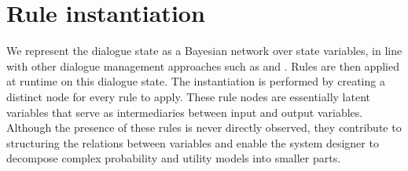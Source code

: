 

\section{Rule instantiation}
\label{sec:ruleinstantiation}

We represent the dialogue state as a Bayesian network over state variables, in line with other dialogue management approaches such as \cite{Thomson:2010:BUD:1772996.1773040} and \cite{bui2010}. Rules are then applied at runtime on this dialogue state.  The instantiation is performed by creating a distinct node for every rule to apply. These rule nodes are essentially latent variables that serve as intermediaries between input and output variables.  Although the presence of these rules is never directly observed, they contribute to structuring the relations between variables and enable the system designer to decompose complex probability and utility models into smaller parts.   %


